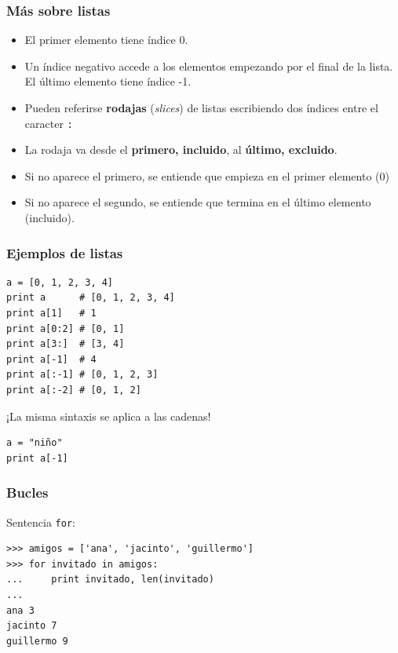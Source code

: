 \documentclass{beamer}
\begin{document}
\begin{frame}[fragile]
\frametitle{Más sobre listas}

\begin{itemize}
\item El primer elemento tiene índice 0.
\item Un índice negativo accede a los elementos empezando por el final
  de la lista. El último elemento tiene índice -1.
\item Pueden referirse {\bf rodajas} (\emph{slices}) de listas
  escribiendo dos índices entre el caracter \verb|:|
\item La rodaja va desde el {\bf primero, incluido}, al {\bf último,
    excluido}.
\item Si no aparece el primero, se entiende que empieza en el primer
  elemento (0)
\item Si no aparece el segundo, se entiende que termina en el último
  elemento (incluido). 
\end{itemize}
\end{frame}


\begin{frame}[fragile]
\frametitle{Ejemplos de listas}

  \begin{footnotesize}
\begin{verbatim}
a = [0, 1, 2, 3, 4]
print a      # [0, 1, 2, 3, 4]
print a[1]   # 1 
print a[0:2] # [0, 1]
print a[3:]  # [3, 4]
print a[-1]  # 4
print a[:-1] # [0, 1, 2, 3]
print a[:-2] # [0, 1, 2]
\end{verbatim}
  \end{footnotesize}
  \begin{center}
¡La misma sintaxis se aplica a las cadenas!
  \end{center}

  \begin{footnotesize}
\begin{verbatim}
a = "niño"
print a[-1]
\end{verbatim}
  \end{footnotesize}


\end{frame}


\begin{frame}[fragile]

\frametitle{ Bucles}
Sentencia \verb|for|:

\begin{footnotesize}
\begin{verbatim}
>>> amigos = ['ana', 'jacinto', 'guillermo']
>>> for invitado in amigos:
...     print invitado, len(invitado)
... 
ana 3
jacinto 7
guillermo 9 
\end{verbatim}
\end{footnotesize}



\end{frame}
\end{document}
